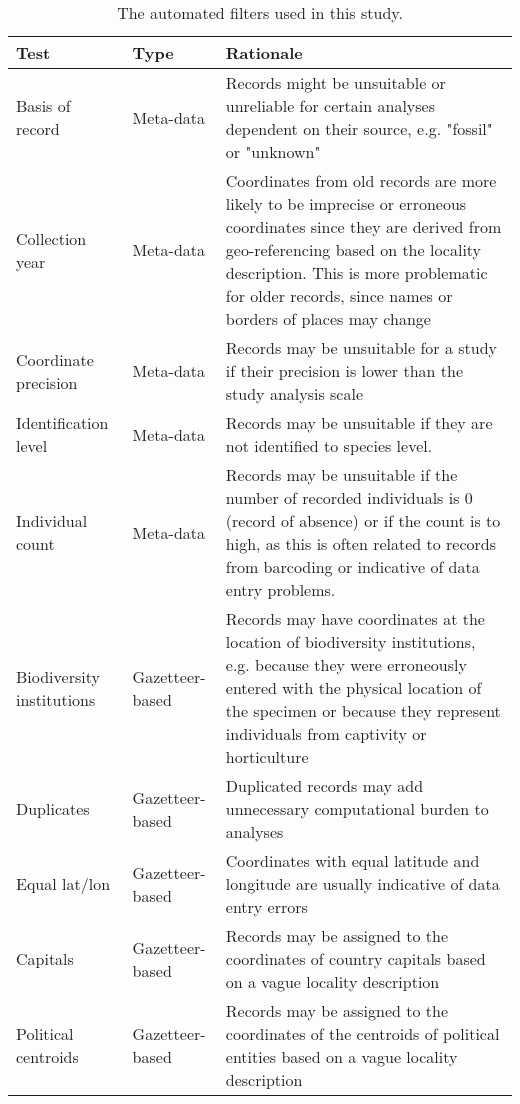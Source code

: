 \documentclass[
  12pt,
]{article}
\begin{document}
\begin{table}[!h]

\caption{\label{tab:tabletests}The automated filters used in this study.}
\centering
\fontsize{9}{11}\selectfont
\begin{tabular}[t]{>{\raggedright\arraybackslash}p{2cm}>{\raggedright\arraybackslash}p{2.5cm}>{\raggedright\arraybackslash}p{10cm}}
\toprule
Test & Type & Rationale\\
\midrule
\rowcolor{gray!6}  Basis of record & Meta-data & Records might be unsuitable or unreliable for certain analyses dependent on their source, e.g. "fossil" or "unknown"\\
Collection year & Meta-data & Coordinates from old records are more likely to be imprecise or erroneous coordinates since they are derived from  geo-referencing based on the locality description. This is more problematic for older records, since names or borders of places may change\\
\rowcolor{gray!6}  Coordinate precision & Meta-data & Records may be unsuitable for a study if their precision is lower than the study analysis scale\\
Identification level & Meta-data & Records may be unsuitable if they are not identified to species level.\\
\rowcolor{gray!6}  Individual count & Meta-data & Records may be unsuitable if the number of recorded individuals is 0 (record of absence) or if the count is to high, as this is often related to records from barcoding or indicative of data entry problems.\\
\addlinespace
Biodiversity institutions & Gazetteer-based & Records may have coordinates at the location of biodiversity institutions, e.g. because they were erroneously entered with the physical location of the specimen or because they represent individuals from captivity or horticulture\\
\rowcolor{gray!6}  Duplicates & Gazetteer-based & Duplicated records may add unnecessary computational burden to analyses\\
Equal lat/lon & Gazetteer-based & Coordinates with equal latitude and longitude are usually indicative of data entry errors\\
\rowcolor{gray!6}  Capitals & Gazetteer-based & Records may be assigned to the coordinates of country capitals based on a vague locality description\\
Political centroids & Gazetteer-based & Records may be assigned to the coordinates of the centroids of political entities based on a vague locality description\\

\end{tabular}
\end{table}
\end{document}
